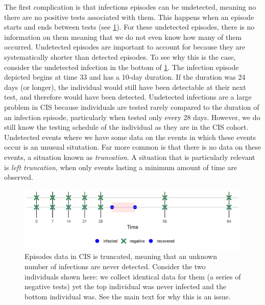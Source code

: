 \documentclass[thesis.tex]{subfiles}
\begin{document}
The first complication is that infections episodes can be undetected, meaning no there are no positive tests associated with them.
This happens when an episode starts and ends between tests (see \cref{perf-test:fig:truncation}).
For these undetected episodes, there is no information on them meaning that we do not even know how many of them occurred.
Undetected episodes are important to account for because they are systematically shorter than detected episodes.
To see why this is the case, consider the undetected infection in the bottom of \cref{perf-test:fig:truncation}.
The infection episode depicted begins at time 33 and has a 10-day duration.
If the duration was 24 days (or longer), the individual would still have been detectable at their next test, and therefore would have been detected.
Undetected infections are a large problem in CIS because individuals are tested rarely compared to the duration of an infection episode, particularly when tested only every 28 days.
However, we do still know the testing schedule of the individual as they are in the CIS cohort.
Undetected events where we have some data on the events in which these events occur is an unusual situtation.
Far more common is that there is no data on these events, a situation known as \emph{truncation}.
A situation that is particularly relevant is \emph{left truncation}, when only events lasting a minimum amount of time are observed.
\begin{figure}
  \centering \includegraphics{cis-perfect-testing/truncation}
  \caption[Truncation in CIS data]{Episodes data in CIS is truncated, meaning that an unknown number of infections are never detected. Consider the two individuals shown here: we collect identical data for them (a series of negative tests) yet the top individual was never infected and the bottom individual was. See the main text for why this is an issue. \label{perf-test:fig:truncation}}
\end{figure}
\end{document}
